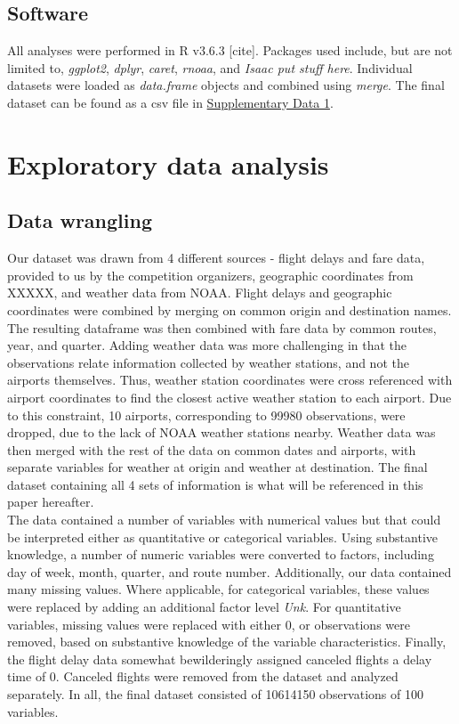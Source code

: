 \documentclass[12pt, a4paper]{book}
\newcommand\tab[1][1cm]{\hspace*{#1}}
\begin{document}
	\section{Software}
	\tab All analyses were performed in R v3.6.3 [cite]. Packages used include, but are not limited to, \textit{ggplot2}, \textit{dplyr}, \textit{caret}, \textit{rnoaa}, and \textit{Isaac put stuff here}. Individual datasets were loaded as \textit{data.frame} objects and combined using \textit{merge}. The final dataset can be found as a csv file in \underline{Supplementary Data 1}. 
	
\chapter{Exploratory data analysis}

	\section{Data wrangling}
	
	\tab Our dataset was drawn from 4 different sources - flight delays and fare data, provided to us by the competition organizers, geographic coordinates from XXXXX, and weather data from NOAA. Flight delays and geographic coordinates were combined by merging on common  origin and destination names. The resulting dataframe was then combined with fare data by common routes, year, and quarter. Adding weather data was more challenging in that the observations relate information collected by weather stations, and not the airports themselves. Thus, weather station coordinates were cross referenced with airport coordinates to find the closest active weather station to each airport. Due to this constraint, 10 airports, corresponding to 99980 observations, were dropped, due to the lack of NOAA weather stations nearby. Weather data was then merged with the rest of the data on common dates and airports, with separate variables for weather at origin and weather at destination.  The final dataset containing all 4 sets of information is what will be referenced in this paper hereafter.\\
	
	\tab The data contained a number of variables with numerical values but that could be interpreted either as quantitative or categorical variables. Using substantive knowledge, a number of numeric variables were converted to factors, including day of week, month, quarter, and route number. Additionally, our data contained many missing values. Where applicable, for categorical variables, these values were replaced by adding an additional factor level \textit{Unk}. For quantitative variables, missing values were replaced with either 0, or observations were removed, based on substantive knowledge of the variable characteristics. Finally, the flight delay data somewhat bewilderingly assigned canceled flights a delay time of 0. Canceled flights were removed from the dataset and analyzed separately.  In all, the final dataset consisted of 10614150 observations of 100 variables. 
	
\end{document}
